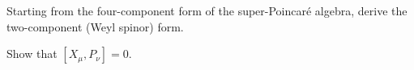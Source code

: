 \documentclass[notes.tex]{subfiles}
\begin{document}


\begin{Exercise}[]
Starting from the four-component form of the super-Poincaré algebra, derive the two-component (Weyl spinor) form.
\end{Exercise}


\begin{Exercise}[]
Show that $[X_\mu,P_\nu]=0$.
\end{Exercise}
\end{document}
